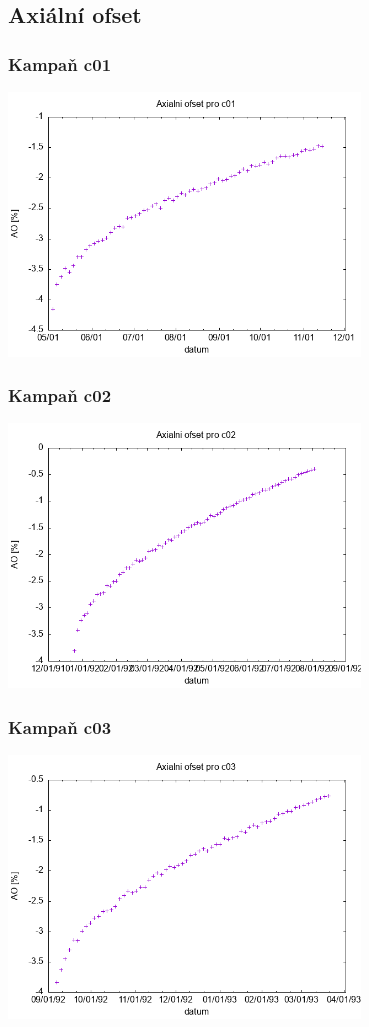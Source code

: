 \documentclass[a4paper,twoside,11pt]{article}
\begin{document}
\subsection{Axiální ofset}
\subsubsection{Kampaň c01}

\includegraphics[width=0.7\textwidth]{../plots/ao_c01}

\subsubsection{Kampaň c02}

\includegraphics[width=0.7\textwidth]{../plots/ao_c02}

\subsubsection{Kampaň c03}

\includegraphics[width=0.7\textwidth]{../plots/ao_c03}
\end{document}
